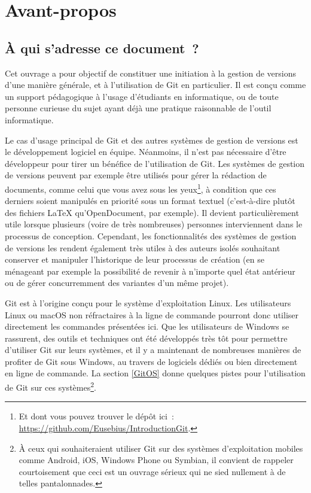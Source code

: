 \chapter*{Avant-propos}\label{chapAvantPropos}
\thispagestyle{empty}

\section*{À qui s'adresse ce document~?}

Cet ouvrage a pour objectif de constituer une initiation à la gestion
de versions d'une manière générale, et à l'utilisation de Git en
particulier. Il est conçu comme un support pédagogique à l'usage
d'étudiants en informatique, ou de toute personne curieuse du sujet
ayant déjà une pratique raisonnable de l'outil informatique.

Le cas d'usage principal de Git et des autres systèmes de gestion de
versions est le développement logiciel en équipe. Néanmoins, il n'est
pas nécessaire d'être développeur pour tirer un bénéfice de
l'utilisation de Git. Les systèmes de gestion de versions peuvent par
exemple être utilisés pour gérer la rédaction de documents, comme
celui que vous avez sous les yeux\footnote{Et dont vous pouvez trouver
  le dépôt ici~: \url{https://github.com/Eusebius/IntroductionGit}.},
à condition que ces derniers soient manipulés en priorité sous un
format textuel (c'est-à-dire plutôt des fichiers \LaTeX
qu'OpenDocument, par exemple). Il devient particulièrement utile
lorsque plusieurs (voire de très nombreuses) personnes interviennent
dans le processus de conception. Cependant, les fonctionnalités des
systèmes de gestion de versions les rendent également très utiles à
des auteurs isolés souhaitant conserver et manipuler l'historique de
leur processus de création (en se ménageant par exemple la possibilité
de revenir à n'importe quel état antérieur ou de gérer concurremment
des variantes d'un même projet).

Git est à l'origine conçu pour le système d'exploitation Linux. Les
utilisateurs Linux ou macOS non réfractaires à la ligne de commande
pourront donc utiliser directement les commandes présentées ici. Que
les utilisateurs de Windows se rassurent, des outils et techniques ont
été développés très tôt pour permettre d'utiliser Git sur leurs
systèmes, et il y a maintenant de nombreuses manières de profiter de
Git sous Windows, au travers de logiciels dédiés ou bien directement
en ligne de commande. La section \ref{GitOS} donne quelques pistes
pour l'utilisation de Git sur ces systèmes\footnote{À ceux qui
  souhaiteraient utiliser Git sur des systèmes d'exploitation mobiles
  comme Android, iOS, Windows Phone ou Symbian, il convient de
  rappeler courtoisement que ceci est un ouvrage sérieux qui ne sied
  nullement à de telles pantalonnades.}.

